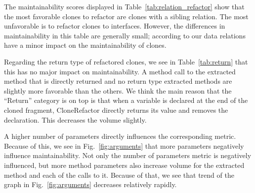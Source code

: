 The maintainability scores displayed in Table~\ref{tab:relation_refactor} show that the most favorable clones to refactor are clones with a sibling relation. The most unfavorable is to refactor clones to interfaces. However, the differences in maintainability in this table are generally small; according to our data relations have a minor impact on the maintainability of clones.

Regarding the return type of refactored clones, we see in Table~\ref{tab:return} that this has no major impact on maintainability. A method call to the extracted method that is directly returned and no return type extracted methods are slightly more favorable than the others. We think the main reason that the ``Return'' category is on top is that when a variable is declared at the end of the cloned fragment, CloneRefactor directly returns its value and removes the declaration. This decreases the volume slightly.

A higher number of parameters directly influences the corresponding metric. Because of this, we see in Fig.~\ref{fig:arguments} that more parameters negatively influence maintainability. Not only the number of parameters metric is negatively influenced, but more method parameters also increase volume for the extracted method and each of the calls to it. Because of that, we see that trend of the graph in Fig.~\ref{fig:arguments} decreases relatively rapidly.
